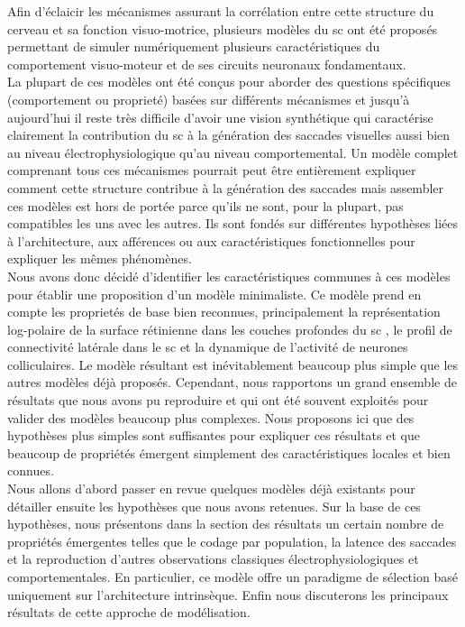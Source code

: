 Afin d'éclaicir les mécanismes assurant la corrélation entre cette structure du cerveau et sa fonction visuo-motrice, plusieurs modèles du \gls{sc} ont été proposés  \cite{VanGisbergen:1985, Scudder:1988, Droulez:1991, Arai:1994,Nichols:1995, Breznen:1997, Lefevre:1998, Findlay:1999, Gancarz:1999, Short:2001, Trappenberg:2001, Badler:2002, Goossens:2006, Nakahara:2006, Marino:2008, Marino:2012} permettant de simuler numériquement plusieurs caractéristiques du comportement visuo-moteur et de ses circuits neuronaux fondamentaux.\\


La plupart de ces modèles ont été conçus pour aborder des questions spécifiques (comportement ou proprieté) basées sur différents mécanismes et jusqu'à aujourd'hui il reste très difficile d'avoir une vision synthétique qui caractérise clairement la contribution du \gls{sc} à la génération des saccades visuelles aussi bien au niveau électrophysiologique qu'au niveau comportemental. Un modèle complet  comprenant tous ces mécanismes pourrait peut être entièrement expliquer comment cette structure contribue à la génération des saccades mais assembler ces modèles est hors de portée parce qu'ils ne sont, pour la plupart, pas compatibles les uns avec les autres. Ils sont fondés sur différentes hypothèses liées à l'architecture, aux afférences ou aux caractéristiques fonctionnelles pour expliquer les mêmes phénomènes.\\

Nous avons donc décidé d'identifier les caractéristiques communes à ces modèles pour établir une proposition d'un modèle minimaliste. Ce modèle prend en compte les proprietés de base bien reconnues, principalement la représentation log-polaire de la surface rétinienne dans les couches profondes du \gls{sc} \cite{Ottes:1986}, le profil de connectivité latérale dans le \gls{sc} et la dynamique de l'activité de neurones colliculaires. Le modèle résultant est inévitablement beaucoup plus simple que les autres modèles déjà proposés. Cependant, nous rapportons un grand ensemble de résultats que nous avons pu reproduire et qui ont été souvent exploités pour valider des modèles beaucoup plus complexes. Nous proposons ici que des hypothèses plus simples sont suffisantes pour expliquer ces résultats et que beaucoup de propriétés émergent simplement des caractéristiques locales et bien connues.\\

Nous allons d'abord passer en revue quelques modèles déjà existants pour détailler ensuite les hypothèses que nous avons retenues. Sur la base de ces hypothèses, nous présentons dans la section des résultats un certain nombre de propriétés émergentes telles que le codage par population, la latence des saccades et la reproduction d'autres observations classiques électrophysiologiques et comportementales. En particulier, ce modèle offre un paradigme de sélection basé uniquement sur l'architecture intrinsèque. Enfin nous discuterons les principaux résultats de cette approche de modélisation.\\

